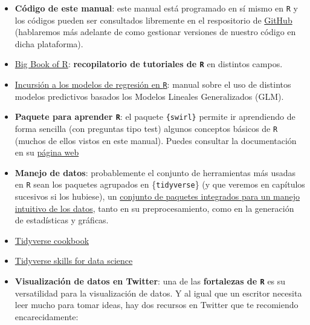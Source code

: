 \documentclass[11pt,]{book}
\begin{document}
\begin{itemize}
\item
  \textbf{Código de este manual}: este manual está programado en sí mismo en \texttt{R} y los códigos pueden ser consultados libremente en el respositorio de \href{https://github.com/dadosdelaplace/docencia}{GitHub} (hablaremos más adelante de como gestionar versiones de nuestro código en dicha plataforma).
\item
  \href{https://www.bigbookofr.com/index.html}{Big Book of R}: \textbf{recopilatorio de tutoriales de \texttt{R}} en distintos campos.
\item
  \href{https://bookdown.org/roback/bookdown-BeyondMLR/}{Incursión a los modelos de regresión en \texttt{R}}: manual sobre el uso de distintos modelos predictivos basados los Modelos Lineales Generalizados (GLM).
\item
  \textbf{Paquete para aprender \texttt{R}}: el paquete \texttt{\{swirl\}} permite ir aprendiendo de forma sencilla (con preguntas tipo test) algunos conceptos básicos de \texttt{R} (muchos de ellos vistos en este manual). Puedes consultar la documentación en su \href{https://swirlstats.com/}{página web}
\item
  \textbf{Manejo de datos}: probablemente el conjunto de herramientas más usadas en \texttt{R} sean los paquetes agrupados en \{\texttt{tidyverse}\} (y que veremos en capítulos sucesivos si los hubiese), un \href{https://www.tidyverse.org/}{conjunto de paquetes integrados para un manejo intuitivo de los datos}, tanto en su preprocesamiento, como en la generación de estadísticas y gráficas.
\item
  \href{https://rstudio-education.github.io/tidyverse-cookbook/}{Tidyverse cookbook}
\item
  \href{https://jhudatascience.org/tidyversecourse/}{Tidyverse skills for data science}
\item
  \textbf{Visualización de datos en Twitter}: una de las \textbf{fortalezas de \texttt{R}} es su versatilidad para la visualización de datos. Y al igual que un escritor necesita leer mucho para tomar ideas, hay dos recursos en Twitter que te recomiendo encarecidamente:


\end{itemize}
\end{document}
